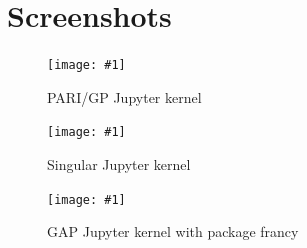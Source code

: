 \documentclass{deliverablereport}
\begin{document}
\appendix
\section{Screenshots}
\newcommand{\screenshot}[2]{
\begin{figure}[ht]
  \texttt{[image: \#1]}
  \caption{#2}
\end{figure}}

\screenshot{pari.png}{PARI/GP Jupyter kernel}
\screenshot{singular_new.png}{Singular Jupyter kernel}
\clearpage
\screenshot{gap.png}{GAP Jupyter kernel with package francy}
\end{document}
